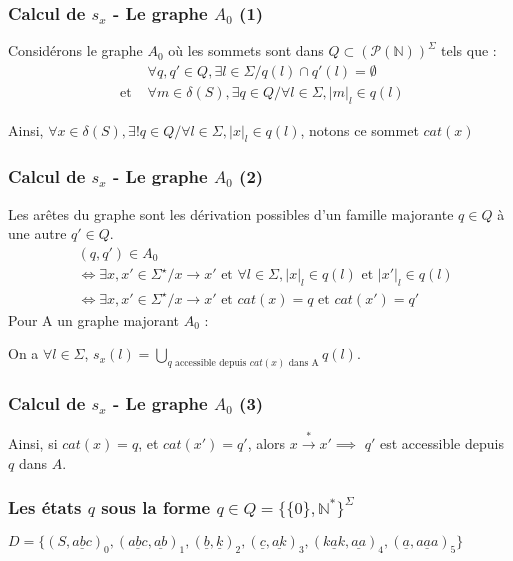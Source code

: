 \documentclass[12pt]{beamer}
\newcommand{\norm}[1]{\lvert #1 \rvert}
\begin{document}
\begin{frame}\frametitle{Calcul de $s_x$ - Le graphe $A_0$ (1)}
Considérons le graphe $A_0$ où les sommets sont dans 
$Q \subset ({\mathcal{P}(\mathbb{N})})^{\Sigma}$ tels que :
\begin{align*}
    &\forall q,q' \in Q, \exists l \in \Sigma / q(l) \cap q'(l) = \emptyset\\
    \text{ et }&\forall m \in \delta(S), \exists q \in Q / \forall l \in \Sigma, \norm{m}_l \in q(l)
\end{align*}

Ainsi, $\forall x \in \delta(S), \exists ! q \in Q / \forall l \in \Sigma, \norm{x}_l \in q(l)$, notons ce sommet $cat(x)$
\end{frame}

\begin{frame}\frametitle{Calcul de $s_x$ - Le graphe $A_0$ (2)}

Les arêtes du graphe sont les dérivation possibles d'un famille majorante $q \in Q$ à une autre $q' \in Q$.
\begin{align*}
    &(q,q') \in A_0 \\
    &\iff \exists x,x' \in \Sigma^\star / x \rightarrow x' \text{ et } \forall l \in \Sigma, \norm{x}_l \in q(l) \text{ et } \norm{x'}_l \in q(l)\\
    &\iff \exists x,x' \in \Sigma^\star / x \rightarrow x' \text{ et } cat(x) = q \text{ et } cat(x') = q'
\end{align*}
Pour A un graphe majorant $A_0$ : 

On a $\forall l \in \Sigma$, $s_x(l) = \bigcup_{q\text{ accessible depuis } cat(x) \text{ dans A}}q(l)$.
\end{frame}
\begin{frame}\frametitle{Calcul de $s_x$ - Le graphe $A_0$ (3)}
Ainsi, si $cat(x) = q$, et $cat(x')=q'$, alors $x \overset{*}{\rightarrow} x' \implies$ $q'$ est accessible depuis $q$ dans $A$. 

\end{frame}

\begin{frame}\frametitle{Les états $q$ sous la forme $q \in Q = \{\{0\},\mathbb{N}^*\}^{\Sigma}$}

$D = \{(S,\underline{ abc })_0,(\underline{ abc },\underline{ ab })_1,(\underline{ b },\underline{ k })_2,(\underline{ c },\underline{ ak })_3,(\underline{ kak },\underline{ aa })_4,(\underline{ a },\underline{ aaa })_5\}$

\begin{figure}
    \centering
    \qquad
\end{figure}

\end{frame}
\end{document}
